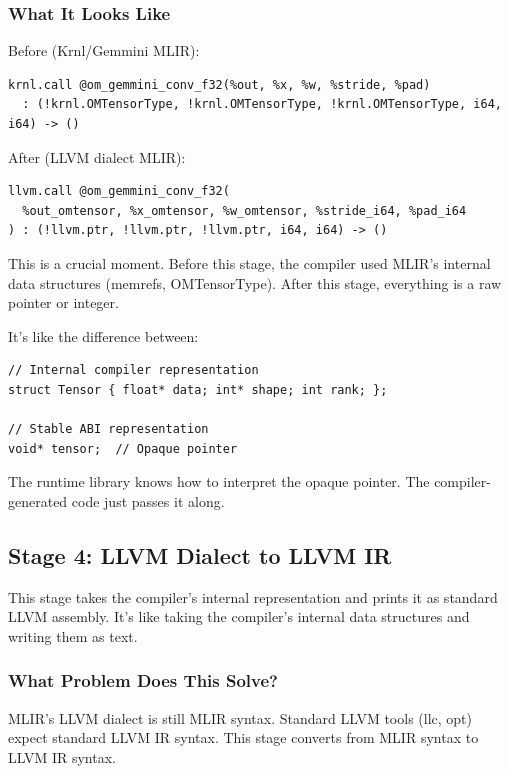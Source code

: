 \documentclass[12pt,a4paper]{article}
\begin{document}
\subsubsection{What It Looks Like}
Before (Krnl/Gemmini MLIR):
\begin{lstlisting}
krnl.call @om_gemmini_conv_f32(%out, %x, %w, %stride, %pad)
  : (!krnl.OMTensorType, !krnl.OMTensorType, !krnl.OMTensorType, i64, i64) -> ()
\end{lstlisting}

After (LLVM dialect MLIR):
\begin{lstlisting}
llvm.call @om_gemmini_conv_f32(
  %out_omtensor, %x_omtensor, %w_omtensor, %stride_i64, %pad_i64
) : (!llvm.ptr, !llvm.ptr, !llvm.ptr, i64, i64) -> ()
\end{lstlisting}

\begin{analogyenv}
This is a crucial moment. Before this stage, the compiler used MLIR's internal data structures (memrefs, OMTensorType). After this stage, everything is a raw pointer or integer.

It's like the difference between:
\begin{lstlisting}
// Internal compiler representation
struct Tensor { float* data; int* shape; int rank; };

// Stable ABI representation
void* tensor;  // Opaque pointer
\end{lstlisting}

The runtime library knows how to interpret the opaque pointer. The compiler-generated code just passes it along.
\end{analogyenv}

\subsection{Stage 4: LLVM Dialect to LLVM IR}

\begin{analogyenv}
This stage takes the compiler's internal representation and prints it as standard LLVM assembly. It's like taking the compiler's internal data structures and writing them as text.
\end{analogyenv}

\subsubsection{What Problem Does This Solve?}
MLIR's LLVM dialect is still MLIR syntax. Standard LLVM tools (llc, opt) expect standard LLVM IR syntax. This stage converts from MLIR syntax to LLVM IR syntax.
\end{document}
